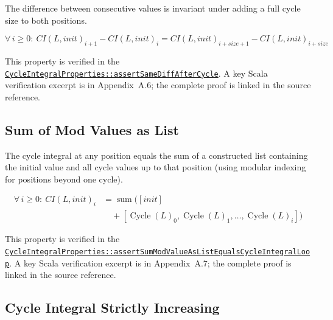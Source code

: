 The difference between consecutive values is invariant under adding a full
cycle size to both positions.

\begin{equation*}
\forall\, i \geq 0: \ \mathit{CI}(L, init)_{i+1} - \mathit{CI}(L, init)_i = \mathit{CI}(L, init)_{i+size+1} - \mathit{CI}(L, init)_{i+size}
\end{equation*}

{\raggedright
This property is verified in the
\href{https://github.com/thiagomata/prime-numbers/blob/integral-cycle-article-v1.0.0/src/main/scala/v1/chapter4/cycle/integral/recursive/properties/CycleIntegralProperties.scala}{\texttt{CycleIntegralProperties::\allowbreak assertSameDiffAfterCycle}}.
A key Scala verification excerpt is in Appendix~A.6; the complete proof is
linked in the source reference.
\par}

\subsection{Sum of Mod Values as List}

The cycle integral at any position equals the sum of a constructed list
containing the initial value and all cycle values up to that position (using
modular indexing for positions beyond one cycle).

\begin{equation*}
\begin{aligned}
\forall\, i \geq 0: \ \mathit{CI}(L, init)_i &= \operatorname{sum}([init] \\
&\quad + [\operatorname{Cycle}(L)_0, \operatorname{Cycle}(L)_1, \dots, \operatorname{Cycle}(L)_i])
\end{aligned}
\end{equation*}

{\raggedright
This property is verified in the
\href{https://github.com/thiagomata/prime-numbers/blob/integral-cycle-article-v1.0.0/src/main/scala/v1/chapter4/cycle/integral/recursive/properties/CycleIntegralProperties.scala}{\texttt{CycleIntegralProperties::\allowbreak assertSumModValueAsListEqualsCycleIntegralLoop}}.
A key Scala verification excerpt is in Appendix~A.7; the complete proof is
linked in the source reference.
\par}

\subsection{Cycle Integral Strictly Increasing}

